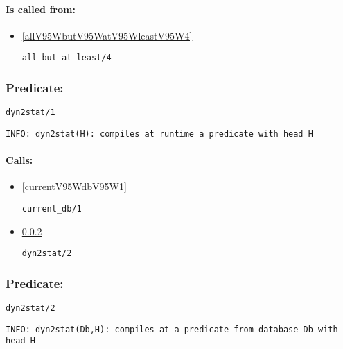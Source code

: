 \paragraph{Is called from:} 
\begin{itemize}
\item \ref{allV95WbutV95WatV95WleastV95W4} 
\begin{verbatim}
all_but_at_least/4
\end{verbatim}

\end{itemize}

\subsubsection{Predicate:} \label{dyn2statV95W1}

\begin{verbatim}
dyn2stat/1
\end{verbatim}

{\small \begin{verbatim}
INFO: dyn2stat(H): compiles at runtime a predicate with head H

\end{verbatim}}
\paragraph{Calls:} 
\begin{itemize}
\item \ref{currentV95WdbV95W1} 
\begin{verbatim}
current_db/1
\end{verbatim}

\item \ref{dyn2statV95W2} 
\begin{verbatim}
dyn2stat/2
\end{verbatim}

\end{itemize}

\subsubsection{Predicate:} \label{dyn2statV95W2}

\begin{verbatim}
dyn2stat/2
\end{verbatim}

{\small \begin{verbatim}
INFO: dyn2stat(Db,H): compiles at a predicate from database Db with head H

\end{verbatim}}

